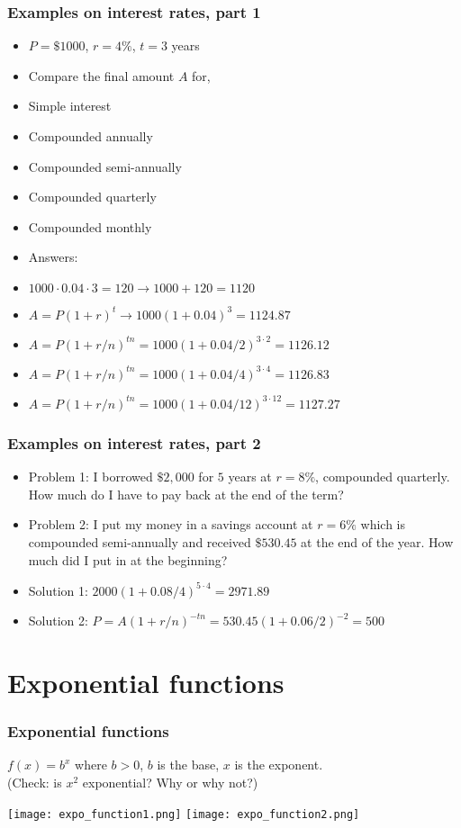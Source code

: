 \documentclass[xcolor=dvipsnames, 9pt]{beamer} %
\begin{document}
\begin{frame}
\frametitle{Examples on interest rates, part 1}
\begin{itemize}
\item $P = \$1000$, $r = 4\%$, $t = 3$ years
\item Compare the final amount $A$ for,
\item Simple interest
\item Compounded annually
\item Compounded semi-annually 
\item Compounded quarterly 
\item Compounded monthly 
\item [] Answers: 
\item $1000 \cdot 0.04 \cdot 3 = 120 \rightarrow 1000 + 120 = 1120$
\item $A = P(1 + r)^t \rightarrow 1000(1 +0.04)^3 = 1124.87$
\item $A = P(1 + r/n)^{tn} = 1000(1+ 0.04/2)^{3 \cdot 2} = 1126.12$
\item $A = P(1 + r/n)^{tn} = 1000(1+ 0.04/4)^{3 \cdot 4} = 1126.83$
\item $A = P(1 + r/n)^{tn} = 1000(1+ 0.04/12)^{3 \cdot 12} = 1127.27$
\end{itemize}
\end{frame}

\begin{frame}
\frametitle{Examples on interest rates, part 2}
\begin{itemize}
\item Problem 1: I borrowed $\$2,000$ for $5$ years at $r = 8\%$, compounded quarterly. How much do I have to pay back at the end of the term? 
\item Problem 2: I put my money in a savings account at $r = 6\%$ which is compounded semi-annually and received $\$530.45$ at the end of the year. How much did I put in at the beginning? 
\item Solution 1: $2000(1 + 0.08/4)^{5 \cdot 4} = 2971.89$
\item Solution 2: $P = A(1 + r/n)^{-tn} = 530.45(1+0.06/2)^{-2} = 500$
\end{itemize}
\end{frame}

\section{Exponential functions}

\begin{frame}
\frametitle{Exponential functions}

$f(x) = b^x$ where $b > 0$, $b$ is the base, $x$ is the exponent. \\ (Check: is $x^2$ exponential? Why or why not?)

\begin{center}
\texttt{[image: expo\_function1.png]}
\texttt{[image: expo\_function2.png]}
\end{center}
\end{frame}
\end{document}
